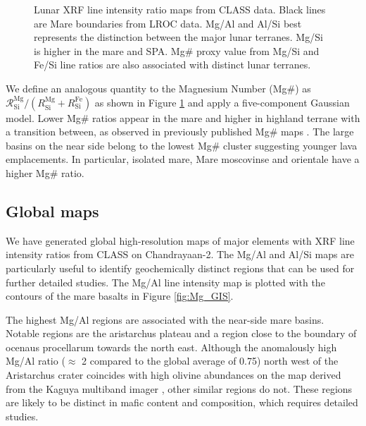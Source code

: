 \documentclass[twocolumn]{aastex631}
\begin{document}
\begin{figure}[htbp]
    \vspace{-25pt}
    \vspace{-25pt}
    \caption{Lunar XRF line intensity ratio maps from CLASS data. Black lines are Mare boundaries from LROC data. Mg/Al and Al/Si best represents the distinction between the major lunar terranes. Mg/Si is higher in the mare and SPA. Mg\# proxy value from Mg/Si and Fe/Si line ratios are also associated with distinct lunar terranes.}
    \label{fig:maps3}
\end{figure}

We define an analogous quantity to the Magnesium Number (Mg\#) as $\mathcal R^\text{Mg}_\text{Si}/\left({R^\text{Mg}_\text{Si}+R^\text{Fe}_\text{Si}}\right)$ as shown in Figure \ref{fig:maps3} and apply a five-component Gaussian model. Lower Mg\# ratios appear in the mare and higher in highland terrane with a transition between, as observed in previously published Mg\# maps \citep{WANG2021105360,ZHANG2023115505}. The large basins on the near side belong to the lowest Mg\# cluster suggesting younger lava emplacements. In particular, isolated mare, Mare moscovinse and orientale have a higher Mg\# ratio.

\subsection{Global maps}

We have generated global high-resolution maps of major elements with XRF line intensity ratios from CLASS on Chandrayaan-2. The Mg/Al and Al/Si maps are particularly useful to identify geochemically distinct regions that can be used for further detailed studies. The Mg/Al line intensity map is plotted with the contours of the mare basalts in Figure \ref{fig:Mg_GIS}.

The highest Mg/Al regions are associated with the near-side mare basins. Notable regions are the aristarchus plateau and a region close to the boundary of ocenaus procellarum towards the north east. Although the anomalously high Mg/Al ratio ($\approx$ 2 compared to the global average of 0.75) north west of the Aristarchus crater coincides with high olivine abundances on the map derived from the Kaguya multiband imager \citep{2019P&SS..165..230L}, other similar regions do not. These regions are likely to be distinct in mafic content and composition, which requires detailed studies.
\end{document}
